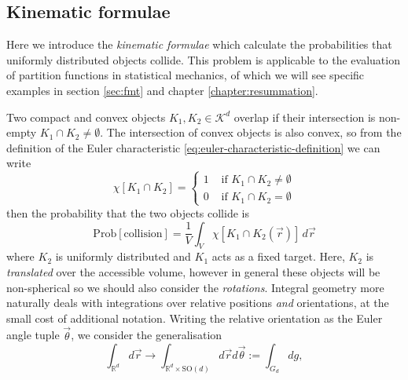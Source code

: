 \subsection{Kinematic formulae}
\label{sec:kinematic-formula}

Here we introduce the \emph{kinematic formulae} which calculate the probabilities that uniformly distributed objects collide.
This problem is applicable to the evaluation of partition functions in statistical mechanics, of which we will see specific examples in section \ref{sec:fmt} and chapter \ref{chapter:resummation}.

Two compact and convex objects $K_1, K_2 \in \mathcal{K}^d$ overlap if their intersection is non-empty $K_1 \cap K_2 \ne \emptyset$.
The intersection of convex objects is also convex, so from the definition of the Euler characteristic \eqref{eq:euler-characteristic-definition} we can write
\begin{equation*}
  \chi[K_1 \cap K_2]
  =
  \begin{cases}
    1 & \textrm{ if } K_1 \cap K_2 \ne \emptyset \\
    0 & \textrm{ if } K_1 \cap K_2 = \emptyset
  \end{cases}
\end{equation*}
then the probability that the two objects collide is
\begin{equation*}
  \mathrm{Prob} \left[ \textrm{collision} \right]
  =
  \frac{1}{V} \int_V \chi[K_1 \cap K_2(\vec{r})] \, d\vec{r}
\end{equation*}
where $K_2$ is uniformly distributed and $K_1$ acts as a fixed target.
Here, $K_2$ is \emph{translated} over the accessible volume, however in general these objects will be non-spherical so we should also consider the \emph{rotations}.
Integral geometry more naturally deals with integrations over relative positions \emph{and} orientations, at the small cost of additional notation.
Writing the relative orientation as the Euler angle tuple $\vec{\theta}$, we consider the generalisation
\begin{equation*}
  \int_{\mathbb{R}^d} d\vec{r}
  \to
  \int_{\mathbb{R}^d \times \mathrm{SO}(d)} d\vec{r} d\vec{\theta}
  :=
  \int_{G_d} dg,
\end{equation*}
